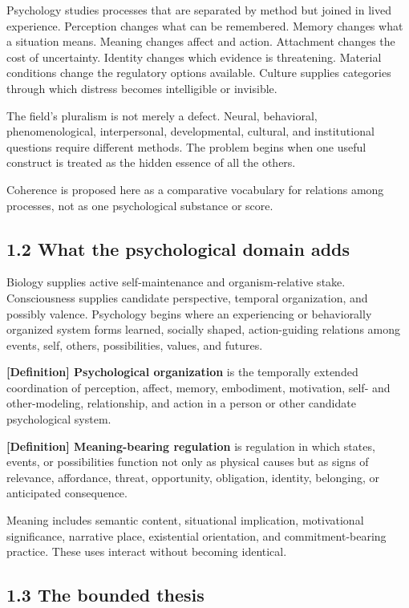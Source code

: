\documentclass[
  11pt,
]{article}
\begin{document}
Psychology studies processes that are separated by method but joined in
lived experience. Perception changes what can be remembered. Memory
changes what a situation means. Meaning changes affect and action.
Attachment changes the cost of uncertainty. Identity changes which
evidence is threatening. Material conditions change the regulatory
options available. Culture supplies categories through which distress
becomes intelligible or invisible.

The field's pluralism is not merely a defect. Neural, behavioral,
phenomenological, interpersonal, developmental, cultural, and
institutional questions require different methods. The problem begins
when one useful construct is treated as the hidden essence of all the
others.

Coherence is proposed here as a comparative vocabulary for relations
among processes, not as one psychological substance or score.

\subsection{1.2 What the psychological domain
adds}\label{what-the-psychological-domain-adds}

Biology supplies active self-maintenance and organism-relative stake.
Consciousness supplies candidate perspective, temporal organization, and
possibly valence. Psychology begins where an experiencing or
behaviorally organized system forms learned, socially shaped,
action-guiding relations among events, self, others, possibilities,
values, and futures.

\textbf{{[}Definition{]} Psychological organization} is the temporally
extended coordination of perception, affect, memory, embodiment,
motivation, self- and other-modeling, relationship, and action in a
person or other candidate psychological system.

\textbf{{[}Definition{]} Meaning-bearing regulation} is regulation in
which states, events, or possibilities function not only as physical
causes but as signs of relevance, affordance, threat, opportunity,
obligation, identity, belonging, or anticipated consequence.

Meaning includes semantic content, situational implication, motivational
significance, narrative place, existential orientation, and
commitment-bearing practice. These uses interact without becoming
identical.

\subsection{1.3 The bounded thesis}\label{the-bounded-thesis}
\end{document}
